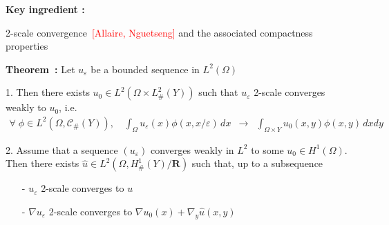 \documentclass[mathserif,9pt]{beamer}
\def\e{{\varepsilon}}
\def\ds{\displaystyle}
\def\R{\mathbf R}
\begin{document}
\begin{frame}
\small{

\textcolor{ox}{\bf Key ingredient :}  
\medskip

2-scale convergence~\textcolor{red}{[Allaire, Nguetseng]}
and the associated compactness properties
\vspace*{5mm}

{\bf Theorem~:} \quad Let $u_\e$ be a bounded sequence in $L^2(\Omega)$
\medskip

1. Then there exists $u_0 \in L^2(\Omega \times L^2_\#(Y))$ such that
$u_\e$ 2-scale converges weakly to $u_0$, i.e.
\textcolor{ox}{
\begin{eqnarray*}
\forall\; \phi \in L^2(\Omega, {\mathcal C}_\#(Y)), \quad
\ds\int_\Omega u_\e(x) \phi(x, x/\e) \,dx
&\rightarrow&
\ds\int_{\Omega \times Y}
u_0(x,y) \phi(x,y)\, dxdy
\end{eqnarray*}}
\vspace*{5mm}


2. Assume that a sequence $(u_\e)$ converges weakly in $L^2$ to some
$u_0 \in H^1(\Omega)$. Then there exists $\hat{u} \in L^2(\Omega,H^1_\#(Y)/\R)$ 
such that, up to a subsequence
\medskip

\begin{itemize}
\item[-]
$u_\e$ 2-scale converges to $u$
\medskip

\item[-]
$\nabla u_\e$ 2-scale converges to $\nabla u_0(x) + \nabla_y \hat{u}(x,y)$
\end{itemize}

}
\end{frame}
\end{document}
